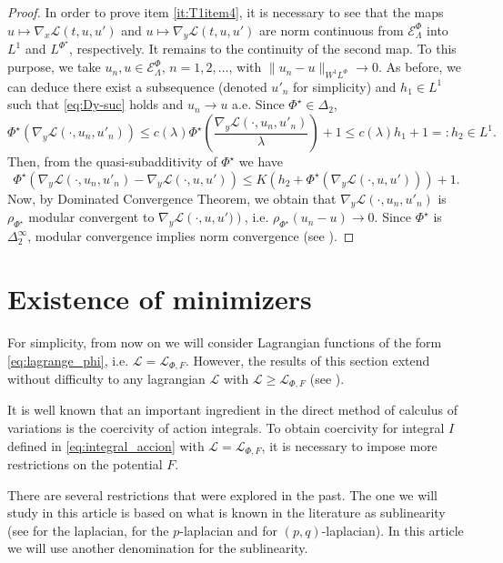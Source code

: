 \documentclass[twoside]{article}
\theoremstyle{remark}
\newcommand{\lphi}{L^{\Phi}}
\newcommand{\lpsi}{L^{\Phi^{\star}}}
\newcommand{\sobnor}{\|_{W^{1}\lphi}}
\newcommand{\domi}{\mathcal{E}^{\Phi}}
\renewcommand{\leq}{\leqslant}
\renewcommand{\geq}{\geqslant}
\begin{document}
\begin{proof}
In order to prove item  \ref{it:T1item4}, it is necessary to see that the maps \linebreak[4]$u\mapsto \nabla_x\mathcal{L}(t,u,u')$  
and $u\mapsto \nabla_y\mathcal{L}(t,u,u')$  are norm continuous
from $\domi_{\Lambda} $ into $L^1$ and
 $\lpsi$, respectively.  
It remains to the continuity of the second map. 
To this purpose, we take  $u_n, u \in \domi_{\Lambda}$, $n=1,2,\dots$, with $\|u_n- u\sobnor\to 0$.  
As before, we can deduce there exist a subsequence (denoted $u'_n$ for simplicity) and $h_1 \in L^1$ such that \eqref{eq:Dy-suc} holds and $u_n \to u$ a.e.
 Since $\Phi^{\star}\in\Delta_2$, 
\begin{equation}
\Phi^{\star}(\nabla_y \mathcal{L}(\cdot,u_n,u'_n))\leq c(\lambda) \Phi^{\star}\left(\frac{\nabla_y \mathcal{L}(\cdot,u_n,u'_n)}{\lambda}\right)+1\leq c(\lambda)h_1+1=:h_2\in L^1.
\end{equation} 
Then, from the quasi-subadditivity of $\Phi^{\star}$ we have 
\[\Phi^{\star}\left(\nabla_y \mathcal{L}(\cdot,u_n,u'_n)-
\nabla_y \mathcal{L}(\cdot,u,u')\right)\leq K (h_2+\Phi^{\star}(\nabla_y \mathcal{L}(\cdot,u,u')))+1.\]
Now, by Dominated Convergence Theorem, we obtain that 
$\nabla_y \mathcal{L}(\cdot,u_n,u'_n)$ is $\rho_{\Phi^{\star}}$ modular convergent to $\nabla_y \mathcal{L}\left(\cdot,u,u')\right)$, i.e.
$\rho_{\Phi^{\star}}(u_n-u)\to 0$. 
Since $\Phi^{\star}$ is $\Delta_2^{\infty}$, modular convergence implies norm convergence (see \cite{Skaff1969}).
\end{proof}



\section{Existence of minimizers}

For simplicity, from now on we will consider Lagrangian functions of the form \eqref{eq:lagrange_phi}, i.e.  $\mathcal{L}= \mathcal{L}_{\Phi,F}$. However, the results of this section extend without difficulty to any lagrangian $\mathcal{L}$ with $\mathcal{L}\geq \mathcal{L}_{\Phi,F}$ (see \cite{ABGMS2015}).

It is well known that an important ingredient in the direct method of calculus of variations is the coercivity of action integrals. To obtain  coercivity for integral $I$ defined in  \eqref{eq:integral_accion} with $\mathcal{L}= \mathcal{L}_{\Phi,F}$, it is necessary to impose more restrictions on the potential $F$.

There are several restrictions that were explored in the past. The one we will study in this article is based on what is known in the literature as sublinearity (see \cite{tang1998periodic,wu1999periodic,zhao2004periodic} for the laplacian, \cite{tang2010periodic,li2015infinitely} for the $p$-laplacian and \cite{yang2013existence,li2014periodic,pasca2010periodic,pacsca2010some} for $(p,q)$-laplacian). In this article we will use another denomination for the sublinearity.
\end{document}
